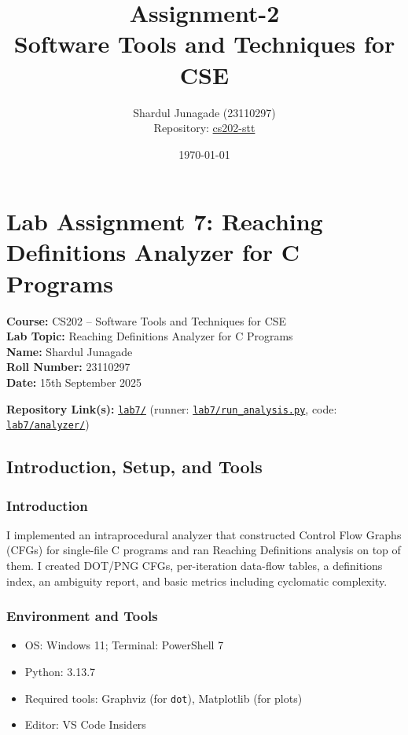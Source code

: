 \documentclass[10pt,a4paper]{report}
\title{\Huge Assignment-2 \\[0.5cm] \LARGE Software Tools and Techniques for CSE}
\author{\Large Shardul Junagade (23110297) \\[0.2cm] \Large Repository: \href{https://github.com/ShardulJunagade/cs202-stt}{cs202-stt}}
\date{\large \today}
\begin{document}
\maketitle
\newpage

\tableofcontents
\newpage

\chapter{Lab Assignment 7: Reaching Definitions Analyzer for C Programs}

\textbf{Course:} CS202 -- Software Tools and Techniques for CSE\\
\textbf{Lab Topic:} Reaching Definitions Analyzer for C Programs\\
\textbf{Name:} Shardul Junagade\\
\textbf{Roll Number:} 23110297\\
\textbf{Date:} 15th September 2025

\vspace{0.5em}
\textbf{Repository Link(s):} \href{https://github.com/ShardulJunagade/cs202-stt/tree/main/lab7/}{\texttt{lab7/}} \space (runner: \href{https://github.com/ShardulJunagade/cs202-stt/tree/main/lab7/run\_analysis.py}{\texttt{lab7/run\_analysis.py}}, code: \href{https://github.com/ShardulJunagade/cs202-stt/tree/main/lab7/analyzer/}{\texttt{lab7/analyzer/}})


\section{Introduction, Setup, and Tools}

\subsection{Introduction}
I implemented an intraprocedural analyzer that constructed Control Flow Graphs (CFGs) for single-file C programs and ran Reaching Definitions analysis on top of them. I created DOT/PNG CFGs, per-iteration data-flow tables, a definitions index, an ambiguity report, and basic metrics including cyclomatic complexity.

\subsection{Environment and Tools}
\begin{itemize}[itemsep=0em, topsep=0pt]
    \item OS: Windows 11; Terminal: PowerShell 7
    \item Python: 3.13.7
    \item Required tools: Graphviz (for \texttt{dot}), Matplotlib (for plots)
    \item Editor: VS Code Insiders
\end{itemize}
\end{document}

